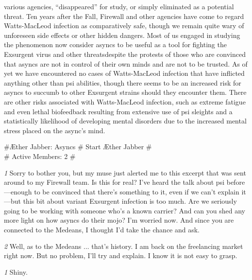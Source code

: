 various agencies, “disappeared” for study, or simply eliminated as a potential threat. Ten years after the Fall, Firewall and other agencies have come to regard Watts-MacLeod infection as comparatively safe, though we remain quite wary of unforeseen side effects or other hidden dangers. Most of us engaged in studying the phenomenon now consider asyncs to be useful as a tool for fighting the Exsurgent virus and other threatsdespite the protests of those who are convinced that asyncs are not in control of their own minds and are not to be trusted. As of yet we have encountered no cases of Watts-MacLeod infection that have inflicted anything other than psi abilities, though there seems to be an increased risk for asyncs to succumb to other Exsurgent strains should they encounter them. There are other risks associated with Watts-MacLeod infection, such as extreme fatigue and even lethal biofeedback resulting from extensive use of psi sleights and a statistically likelihood of developing mental disorders due to the increased mental stress placed on the async’s mind. 

\newpage

\#{Æther Jabber: Asyncs} \# Start Æther Jabber \# \\ \# Active Members: 2 \# 

\textit{\textit{1}} Sorry to bother you, but my muse just alerted me to this excerpt that was sent around to my Firewall team. Is this for real? I’ve heard the talk about psi before—enough to be convinced that there’s something to it, even if we can’t explain it—but this bit about variant Exsurgent infection is too much. Are we seriously going to be working with someone who’s a known carrier? And can you shed any more light on how asyncs do their mojo? I’m worried now. And since you are connected to the Medeans, I thought I’d take the chance and ask. 

\textit{\textit{2}} Well, as to the Medeans ... that’s history. I am back on the freelancing market right now. But no problem, I’ll try and explain. I know it is not easy to grasp. 

\textit{\textit{1}} Shiny. 

